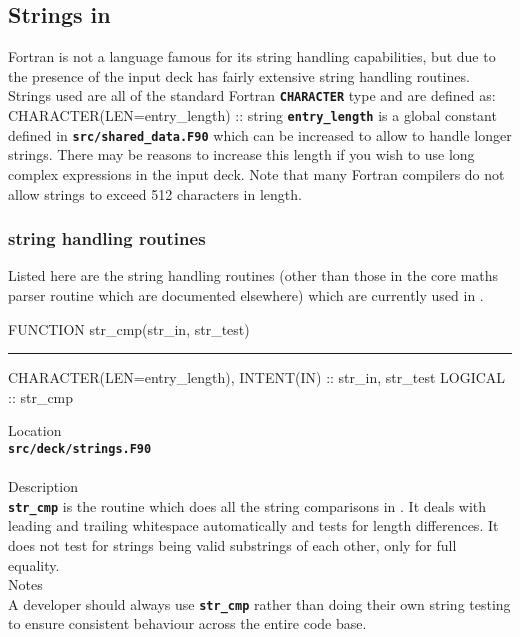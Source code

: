 \documentclass[12pt,a4paper]{article}
\newcommand{\HRule}{\rule[0.3cm]{\linewidth}{0.5mm}}
\newcommand{\inlinecode}[1]{{\color{warwickred} \bf\texttt{#1}}}
\newcommand{\EPOCH}{{\color{warwickdark}\fontfamily{phv}\selectfont{EPOCH}}}
\newenvironment{boxverbatim}{\lboxverbatim{none}}{\endlboxverbatim}
\begin{document}
\subsection{Strings in {\EPOCH}}
Fortran is not a language famous for its string handling capabilities, but due
to the presence of the input deck {\EPOCH} has fairly extensive string handling
routines. Strings used are all of the standard Fortran \inlinecode{CHARACTER}
type and are defined as:
\begin{boxverbatim}
CHARACTER(LEN=entry_length) :: string
\end{boxverbatim}
\inlinecode{entry\_length} is a global constant defined in
\inlinecode{src/shared\_data.F90} which can be increased to allow {\EPOCH} to
handle longer strings. There may be reasons to increase this length if you wish
to use long complex expressions in the input deck. Note that many Fortran
compilers do not allow strings to exceed 512 characters in length.

\subsubsection{{\EPOCH} string handling routines}

Listed here are the string handling routines (other than those in the core
maths parser routine which are documented elsewhere) which are currently used
in {\EPOCH}.

\pagebreak
\begin{codedef}
FUNCTION str_cmp(str_in, str_test)
\HRule
CHARACTER(LEN=entry_length), INTENT(IN) :: str_in, str_test
LOGICAL :: str_cmp
\end{codedef}
\vspace{1cm}
{\Large Location\\}
\inlinecode{src/deck/strings.F90}\\
\\[0.5cm]
{\Large Description\\}
\inlinecode{str\_cmp} is the routine which does all the string comparisons in
{\EPOCH}. It deals with leading and trailing whitespace automatically and
tests for length differences. It does not test for strings being
valid substrings of each other, only for full equality.
\\[0.5cm]
{\Large Notes\\}
A developer should always use \inlinecode{str\_cmp} rather than doing their own
string testing to ensure consistent behaviour across the entire {\EPOCH} code
base.
\end{document}
